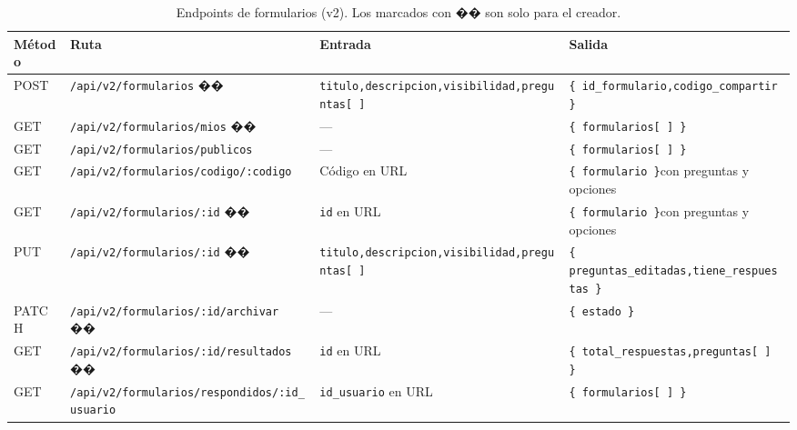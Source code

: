 \documentclass[12pt,a4paper]{article}
\begin{document}
\begin{table}[H]
\centering
\renewcommand{\arraystretch}{1.5}
\begin{tabular}{p{1.2cm} p{5.5cm} p{3.5cm} p{3cm}}
\toprule
\textbf{Método} & \textbf{Ruta} & \textbf{Entrada} & \textbf{Salida} \\
\midrule
POST  & \texttt{/api/v2/formularios} �� &
  \texttt{titulo,}\newline\texttt{descripcion,}\newline\texttt{visibilidad,}\newline\texttt{preguntas[ ]} &
  \texttt{\{ id\_formulario,}\newline\texttt{codigo\_compartir \}} \\
\midrule
GET   & \texttt{/api/v2/formularios/mios} �� &
  — &
  \texttt{\{ formularios[ ] \}} \\
\midrule
GET   & \texttt{/api/v2/formularios/publicos} &
  — &
  \texttt{\{ formularios[ ] \}} \\
\midrule
GET   & \texttt{/api/v2/formularios/}\newline\texttt{codigo/:codigo} &
  Código en URL &
  \texttt{\{ formulario \}}\newline con preguntas y opciones \\
\midrule
GET   & \texttt{/api/v2/formularios/:id} �� &
  \texttt{id} en URL &
  \texttt{\{ formulario \}}\newline con preguntas y opciones \\
\midrule
PUT   & \texttt{/api/v2/formularios/:id} �� &
  \texttt{titulo,}\newline\texttt{descripcion,}\newline\texttt{visibilidad,}\newline\texttt{preguntas[ ]} &
  \texttt{\{ preguntas\_editadas,}\newline\texttt{tiene\_respuestas \}} \\
\midrule
PATCH & \texttt{/api/v2/formularios/}\newline\texttt{:id/archivar} �� &
  — &
  \texttt{\{ estado \}} \\
\midrule
GET   & \texttt{/api/v2/formularios/}\newline\texttt{:id/resultados} �� &
  \texttt{id} en URL &
  \texttt{\{ total\_respuestas,}\newline\texttt{preguntas[ ] \}} \\
\midrule
GET   & \texttt{/api/v2/formularios/}\newline\texttt{respondidos/:id\_usuario} &
  \texttt{id\_usuario} en URL &
  \texttt{\{ formularios[ ] \}} \\
\bottomrule
\end{tabular}
\caption{Endpoints de formularios (v2). Los marcados con �� son solo para el creador.}
\end{table}
\end{document}
